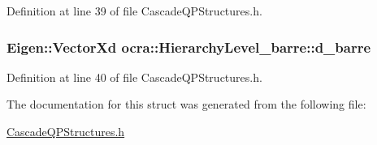 Definition at line 39 of file Cascade\+Q\+P\+Structures.\+h.

\subsubsection[{\texorpdfstring{d\+\_\+barre}{d_barre}}]{\setlength{\rightskip}{0pt plus 5cm}Eigen\+::\+Vector\+Xd ocra\+::\+Hierarchy\+Level\+\_\+barre\+::d\+\_\+barre}\hypertarget{structocra_1_1HierarchyLevel__barre_a65cc4a8fa90c825809493c2bbc921a3d}{}\label{structocra_1_1HierarchyLevel__barre_a65cc4a8fa90c825809493c2bbc921a3d}


Definition at line 40 of file Cascade\+Q\+P\+Structures.\+h.



The documentation for this struct was generated from the following file\+:\begin{DoxyCompactItemize}
\item 
\hyperlink{CascadeQPStructures_8h}{Cascade\+Q\+P\+Structures.\+h}\end{DoxyCompactItemize}
